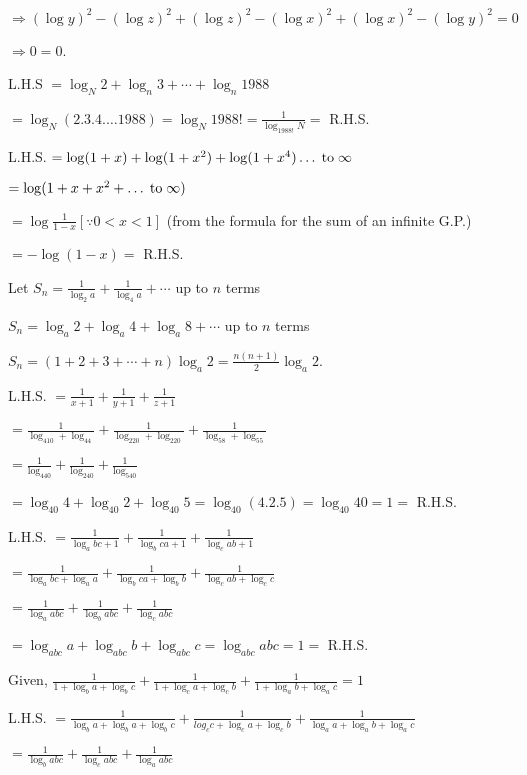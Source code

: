   $\Rightarrow (\log y)^2 - (\log z)^2 + (\log z)^2 - (\log x)^2 + (\log x)^2 - (\log y)^2 = 0$

  $\Rightarrow 0 = 0$.
\item L.H.S $= \log_N2 + \log_n3 + \cdots + \log_n1988$

  $= \log_N(2.3.4.\ldots1988) = \log_N1988! = \frac{1}{\log_{1988!}N} =$ R.H.S.
\item L.H.S. $= \log(1 + x) + \log(1 + x^2) + \log(1 + x^4)\ldots\;{\rm to}\;\infty$

  $= \log(1 + x + x^2 + \ldots\;{\rm to}\;\infty)$

  $= \log\frac{1}{1 - x}[\because 0 < x < 1]$ (from the formula for the sum of an infinite G.P.)

  $= -\log(1 - x) =$ R.H.S.
\item Let $S_n = \frac{1}{\log_2a} + \frac{1}{\log_4a} + \cdots$ up to $n$ terms

  $S_n = \log_a2 + \log_a4 + \log_a8 + \cdots$ up to $n$ terms

  $S_n = (1 + 2 + 3 + \cdots + n)\log_a2 = \frac{n(n + 1)}{2}\log_a2$.
\item L.H.S. $= \frac{1}{x + 1} + \frac{1}{y + 1} + \frac{1}{z + 1}$

  $= \frac{1}{\log_410 + \log_44} + \frac{1}{\log_220 + \log_220} + \frac{1}{\log_58 + \log_55}$

  $= \frac{1}{\log_440} + \frac{1}{\log_240} + \frac{1}{\log_540}$

  $= \log_{40}4 + \log_{40}2 + \log_{40}5 = \log_{40}(4.2.5) = \log_{40}40 = 1 =$ R.H.S.
\item L.H.S. $= \frac{1}{\log_abc + 1} + \frac{1}{\log_bca + 1} + \frac{1}{\log_cab + 1}$

  $= \frac{1}{\log_abc + \log_aa} + \frac{1}{\log_bca + \log_bb} + \frac{1}{\log_cab + \log_cc}$

  $= \frac{1}{\log_aabc} + \frac{1}{\log_babc} + \frac{1}{\log_cabc}$

  $= \log_{abc}a + \log_{abc}b + \log_{abc}c = \log_{abc}abc = 1 =$ R.H.S.
\item Given, $\frac{1}{1 + \log_ba + \log_bc} + \frac{1}{1 + \log_ca + \log_cb} + \frac{1}{1 + \log_ab + \log_ac} = 1$

  L.H.S. $= \frac{1}{\log_ba + \log_ba + \log_bc} + \frac{1}{log_cc + \log_ca + \log_cb} + \frac{1}{\log_aa + \log_ab + \log_ac}$

  $= \frac{1}{\log_babc} + \frac{1}{\log_cabc} + \frac{1}{\log_aabc}$

